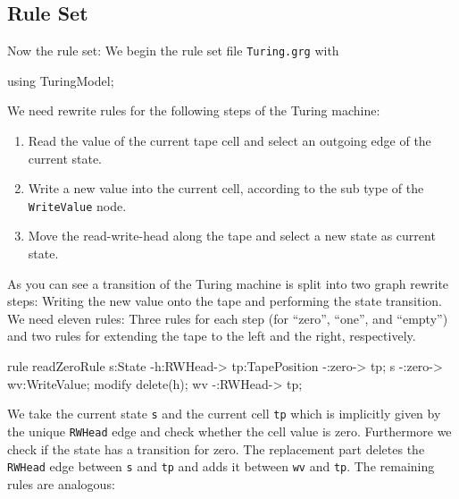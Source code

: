 \subsection{Rule Set}
Now the rule set: We begin the rule set file \texttt{Turing.grg} with
\begin{grgen}[firstnumber=1]
using TuringModel;

\end{grgen}
We need rewrite rules for the following steps of the Turing machine:
\begin{enumerate}
  \item Read the value of the current tape cell and select an outgoing edge of the current state.
  \item Write a new value into the current cell, according to the sub type of the \texttt{WriteValue} node.
  \item Move the read-write-head along the tape and select a new state as current state.
\end{enumerate}
As you can see a transition of the Turing machine is split into two graph rewrite steps: Writing the new value onto the tape and performing the state transition. We need eleven rules: Three rules for each step (for ``zero'', ``one'', and ``empty'') and two rules for extending the tape to the left and the right, respectively.
\begin{grgen}[firstnumber=last]
rule readZeroRule {
	s:State -h:RWHead-> tp:TapePosition -:zero-> tp;
	s -:zero-> wv:WriteValue;
	modify {
		delete(h);
		wv -:RWHead-> tp;
	}
}

\end{grgen}
We take the current state \texttt{s} and the current cell \texttt{tp} which is implicitly given by the unique \texttt{RWHead} edge and check whether the cell value is zero. Furthermore we check if the state has a transition for zero. The replacement part deletes the \texttt{RWHead} edge between \texttt{s} and \texttt{tp} and adds it between \texttt{wv} and \texttt{tp}. The remaining rules are analogous:
